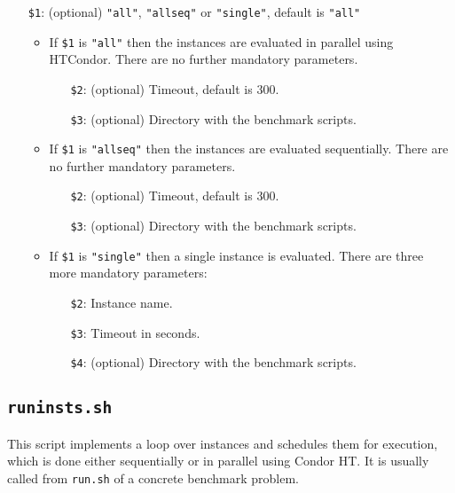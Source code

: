 \documentclass[a4paper]{article}
\begin{document}
		    \medskip{}
		    \begin{itemize}
				\item[{\tt \$1}:] (optional) {\tt "all"}, {\tt "allseq"} or {\tt "single"}, default is {\tt "all"}
					\begin {itemize}
						\item If {\tt \$1} is {\tt "all"} then the instances are evaluated in parallel using HTCondor. There are no further mandatory parameters.
							\begin{itemize}
								\item[{\tt \$2}:] (optional) Timeout, default is $300$.
								\item[{\tt \$3}:] (optional) Directory with the benchmark scripts.
							\end{itemize}
						\item If {\tt \$1} is {\tt "allseq"} then the instances are evaluated sequentially. There are no further mandatory parameters.
							\begin{itemize}
								\item[{\tt \$2}:] (optional) Timeout, default is $300$.
								\item[{\tt \$3}:] (optional) Directory with the benchmark scripts.
							\end{itemize}
						\item If {\tt \$1} is {\tt "single"} then a single instance is evaluated. There are three more mandatory parameters:
							\begin{itemize}
								\item[{\tt \$2}:] Instance name.
								\item[{\tt \$3}:] Timeout in seconds.
								\item[{\tt \$4}:] (optional) Directory with the benchmark scripts.
							\end{itemize}
					\end{itemize}
		    \end{itemize}
				
		\subsection{\tt runinsts.sh}
		\label{sec:architecture:runinsts}
		
		    This script implements a loop over instances and schedules them for execution,
		    which is done either sequentially or in parallel using Condor HT.
		    It is usually called from {\tt run.sh} of a concrete benchmark problem.
		    
\end{document}
